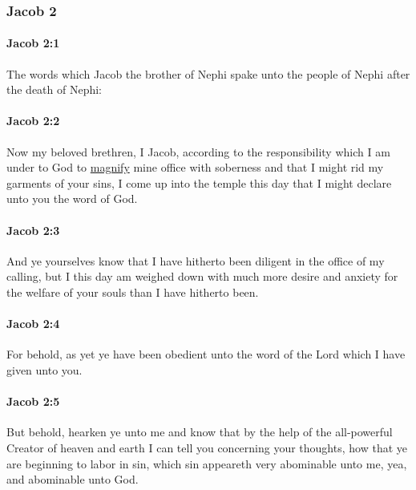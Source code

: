 	\subsubsection{Jacob 2} %
		\label{JACOB-2}
		
		\paragraph{Jacob 2:1} %
			\label{JACOB-2-1}

			The words which Jacob the brother of Nephi spake
			unto the people of Nephi after the death of Nephi:

		\paragraph{Jacob 2:2} %
			\label{JACOB-2-2}

			Now my beloved brethren, I Jacob,
			according to the responsibility which I am under to God
			to \hyperref[MAGNIFY]{magnify} mine office with soberness
			and that I might rid my garments of your sins,
			I come up into the temple this day
			that I might declare unto you the word of God.

		\paragraph{Jacob 2:3} %
			\label{JACOB-2-3}

			And ye yourselves know that I have hitherto been diligent
			in the office of my calling,
			but I this day am weighed down
			with much more desire and anxiety for the welfare of your souls
			than I have hitherto been.

		\paragraph{Jacob 2:4} %
			\label{JACOB-2-4}

			For behold, as yet ye have been obedient
			unto the word of the Lord which I have given unto you.

		\paragraph{Jacob 2:5} %
			\label{JACOB-2-5}

			But behold, hearken ye unto me and know
			that by the help of the all-powerful Creator of heaven and earth
			I can tell you concerning your thoughts,
			how that ye are beginning to labor in sin,
			which sin appeareth very abominable unto me,
			yea, and abominable unto God.

